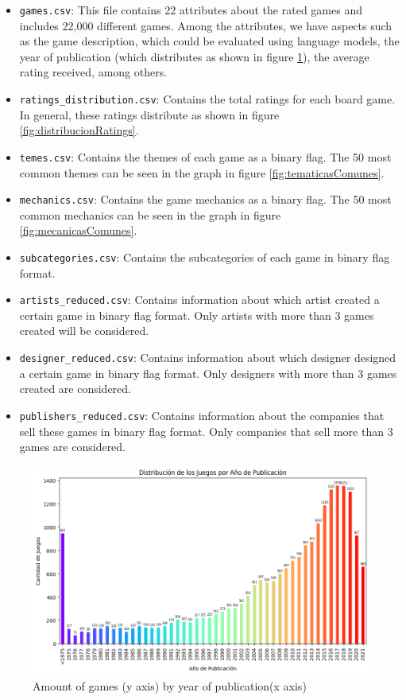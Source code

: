 \documentclass{article}
\begin{document}
\begin{itemize}
    \item \texttt{games.csv}: This file contains 22 attributes about the rated games and includes 22,000 different games. Among the attributes, we have aspects such as the game description, which could be evaluated using language models, the year of publication (which distributes as shown in figure \ref{fig:publishYear}), the average rating received, among others.
    \item \texttt{ratings\_distribution.csv}: Contains the total ratings for each board game. In general, these ratings distribute as shown in figure \ref{fig:distribucionRatings}.
    \item \texttt{temes.csv}: Contains the themes of each game as a binary flag. The 50 most common themes can be seen in the graph in figure \ref{fig:tematicasComunes}.
    \item \texttt{mechanics.csv}: Contains the game mechanics as a binary flag. The 50 most common mechanics can be seen in the graph in figure \ref{fig:mecanicasComunes}.
    \item \texttt{subcategories.csv}: Contains the subcategories of each game in binary flag format.
    \item \texttt{artists\_reduced.csv}: Contains information about which artist created a certain game in binary flag format. Only artists with more than 3 games created will be considered.
    \item \texttt{designer\_reduced.csv}: Contains information about which designer designed a certain game in binary flag format. Only designers with more than 3 games created are considered.
    \item \texttt{publishers\_reduced.csv}: Contains information about the companies that sell these games in binary flag format. Only companies that sell more than 3 games are considered.

\end{itemize}

\begin{figure}
    \centering
    \includegraphics[width=0.8\linewidth]{publishYear.png}
    \caption{Amount of games (y axis) by year of publication(x axis)}
    \label{fig:publishYear}
\end{figure}
\end{document}
